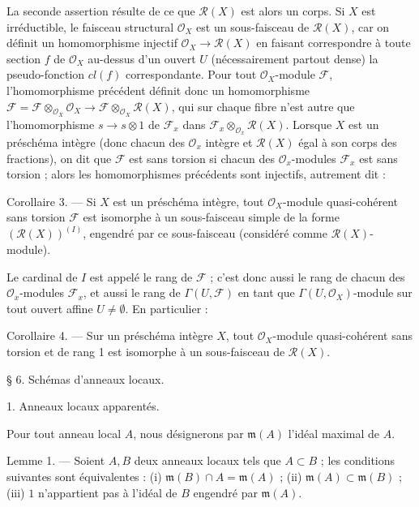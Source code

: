 La seconde assertion résulte de ce que $\mathcal{R}(X)$ est alors un corps. Si $X$ est irréductible, le faisceau structural $\mathcal{O}_X$ est un sous-faisceau de $\mathcal{R}(X)$, car on définit un homomorphisme injectif $\mathcal{O}_X \to \mathcal{R}(X)$ en faisant correspondre à toute section $f$ de $\mathcal{O}_X$ au-dessus d'un ouvert $U$ (nécessairement partout dense) la pseudo-fonction $cl(f)$ correspondante. Pour tout $\mathcal{O}_X$-module $\mathcal{F}$, l'homomorphisme précédent définit donc un homomorphisme $\mathcal{F} = \mathcal{F} \otimes_{\mathcal{O}_X} \mathcal{O}_X \to \mathcal{F} \otimes_{\mathcal{O}_X} \mathcal{R}(X)$, qui sur chaque fibre n'est autre que l'homomorphisme $s \to s \otimes 1$ de $\mathcal{F}_x$ dans $\mathcal{F}_x \otimes_{\mathcal{O}_x} \mathcal{R}(X)$. Lorsque $X$ est un préschéma intègre (donc chacun des $\mathcal{O}_x$ intègre et $\mathcal{R}(X)$ égal à son corps des fractions), on dit que $\mathcal{F}$ est sans torsion si chacun des $\mathcal{O}_x$-modules $\mathcal{F}_x$ est sans torsion ; alors les homomorphismes précédents sont injectifs, autrement dit :

Corollaire 3. — Si $X$ est un préschéma intègre, tout $\mathcal{O}_X$-module quasi-cohérent sans torsion $\mathcal{F}$ est isomorphe à un sous-faisceau simple de la forme $(\mathcal{R}(X))^{(I)}$, engendré par ce sous-faisceau (considéré comme $\mathcal{R}(X)$-module).

Le cardinal de $I$ est appelé le rang de $\mathcal{F}$ ; c'est donc aussi le rang de chacun des $\mathcal{O}_x$-modules $\mathcal{F}_x$, et aussi le rang de $\Gamma(U, \mathcal{F})$ en tant que $\Gamma(U, \mathcal{O}_X)$-module sur tout ouvert affine $U \neq \emptyset$. En particulier :

Corollaire 4. — Sur un préschéma intègre $X$, tout $\mathcal{O}_X$-module quasi-cohérent sans torsion et de rang 1 est isomorphe à un sous-faisceau de $\mathcal{R}(X)$.

\newpage



\setcounter{page}{91}

§ 6. Schémas d'anneaux locaux.

1. Anneaux locaux apparentés.

Pour tout anneau local $A$, nous désignerons par $\mathfrak{m}(A)$ l'idéal maximal de $A$.

Lemme 1. — Soient $A, B$ deux anneaux locaux tels que $A \subset B$ ; les conditions suivantes sont équivalentes : (i) $\mathfrak{m}(B) \cap A = \mathfrak{m}(A)$ ; (ii) $\mathfrak{m}(A) \subset \mathfrak{m}(B)$ ; (iii) $1$ n'appartient pas à l'idéal de $B$ engendré par $\mathfrak{m}(A)$.

